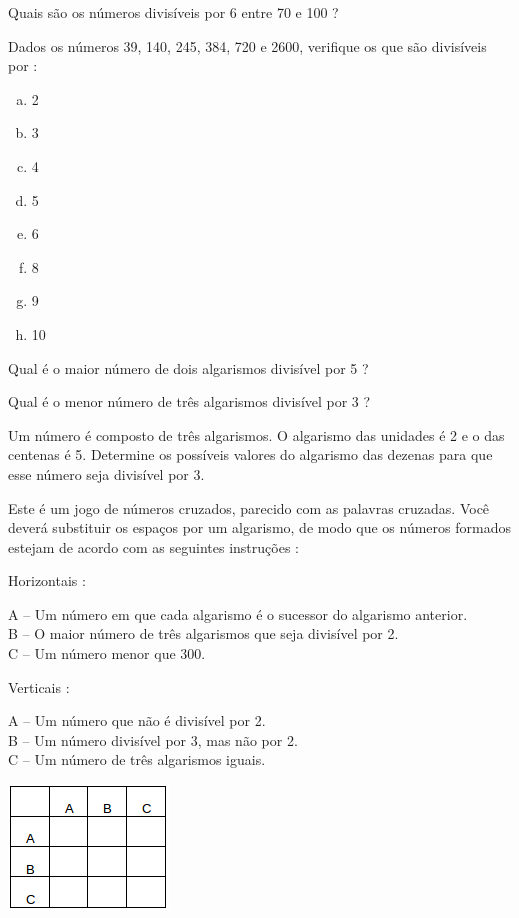 \item Quais são os números divisíveis por 6 entre 70 e 100 ?

\item Dados os números 39, 140, 245, 384, 720 e 2600, verifique os que são divisíveis por :
\begin{multicols}{2}
\begin{enumerate}[a)]
	\item 2
	\item 3
	\item 4
	\item 5
	\item 6
	\item 8
	\item 9
	\item 10
\end{enumerate}
\end{multicols}

\item Qual é o maior número de dois algarismos divisível por 5 ?

\item Qual é o menor número de três algarismos divisível por 3 ?

\item Um número é composto de três algarismos. O algarismo das unidades é 2 e o das centenas é 5. Determine os possíveis valores do algarismo das dezenas para que esse número seja divisível por 3.

\item Este é um jogo de números cruzados, parecido com as palavras cruzadas. Você deverá substituir os espaços por um algarismo, de modo que os números formados estejam de acordo com as seguintes instruções :

Horizontais :

A – Um número em que cada algarismo é o sucessor do algarismo anterior.\\
B – O maior número de três algarismos que seja divisível por 2.\\
C – Um número menor que 300.

Verticais :

A – Um número que não é divisível por 2.\\
B – Um número divisível por 3, mas não por 2.\\
C – Um número de três algarismos iguais.\\
\begin{center}
\includegraphics[scale=1]{figuras/fig103.png}
\end{center}
